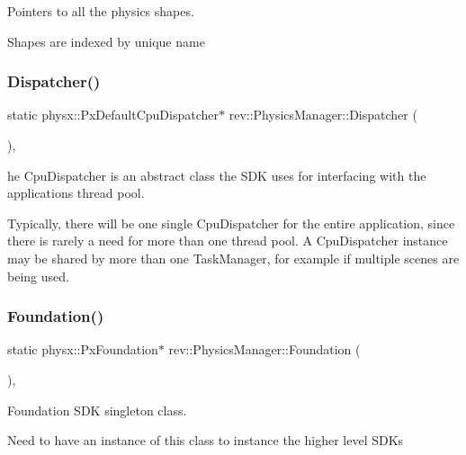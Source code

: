 Pointers to all the physics shapes. 

Shapes are indexed by unique name \mbox{\label{classrev_1_1_physics_manager_a28fdf900280695b969f127fab9c3e7f6}} 
\subsubsection{\texorpdfstring{Dispatcher()}{Dispatcher()}}
{\footnotesize\ttfamily static physx\+::\+Px\+Default\+Cpu\+Dispatcher$\ast$ rev\+::\+Physics\+Manager\+::\+Dispatcher (\begin{DoxyParamCaption}{ }\end{DoxyParamCaption})\hspace{0.3cm}{\ttfamily [inline]}, {\ttfamily [static]}}



he Cpu\+Dispatcher is an abstract class the S\+DK uses for interfacing with the application\textquotesingle{}s thread pool. 

Typically, there will be one single Cpu\+Dispatcher for the entire application, since there is rarely a need for more than one thread pool. A Cpu\+Dispatcher instance may be shared by more than one Task\+Manager, for example if multiple scenes are being used. \mbox{\label{classrev_1_1_physics_manager_a3c3cdc497203c68d9189d1a2baf97e54}} 
\subsubsection{\texorpdfstring{Foundation()}{Foundation()}}
{\footnotesize\ttfamily static physx\+::\+Px\+Foundation$\ast$ rev\+::\+Physics\+Manager\+::\+Foundation (\begin{DoxyParamCaption}{ }\end{DoxyParamCaption})\hspace{0.3cm}{\ttfamily [inline]}, {\ttfamily [static]}}



Foundation S\+DK singleton class. 

Need to have an instance of this class to instance the higher level S\+D\+Ks \mbox{\label{classrev_1_1_physics_manager_a8be417f082121367094ca9c5b6fc92a7}} 
